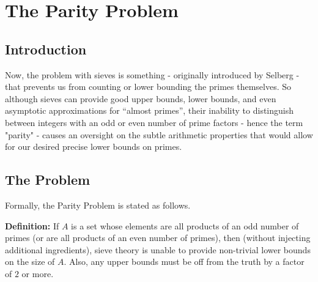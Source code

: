 \documentclass[8pt]{extarticle}
\begin{document}
\section{The Parity Problem}  
\subsection{Introduction}
Now, the problem with sieves is something - originally introduced by Selberg - that prevents us from counting or lower bounding the primes themselves. So although sieves can provide good upper bounds, lower bounds, and even asymptotic approximations for ``almost primes'', their inability to distinguish between integers with an odd or even number of prime factors - hence the term "parity" - causes an oversight on the subtle arithmetic properties that would allow for our desired precise lower bounds on primes.
\subsection{The Problem}
Formally, the Parity Problem is stated as follows.
\begin{boxedsection}
\textbf{Definition:} If $A$ is a set whose elements are all products of an odd number of primes (or are all products of an even number of primes), then (without injecting additional ingredients), sieve theory is unable to provide non-trivial lower bounds on the size of $A$. Also, any upper bounds must be off from the truth by a factor of $2$ or more.
\end{boxedsection}














\pagebreak
\end{document}
